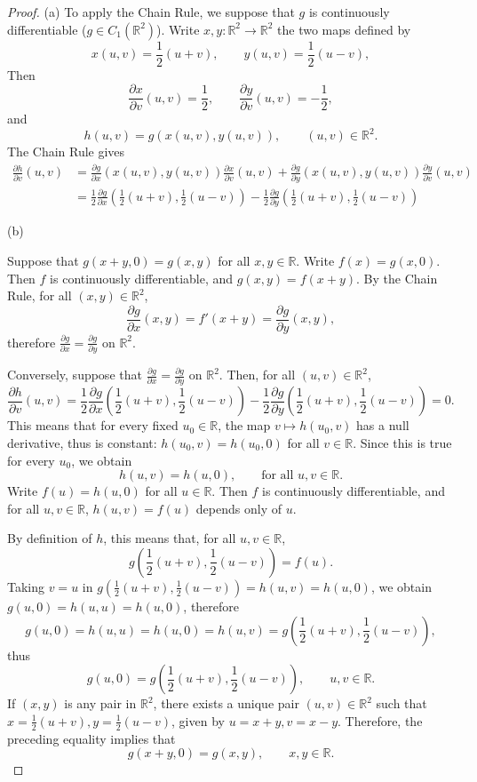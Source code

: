\documentclass[11pt,a4paper]{article}
\newcommand{\R}{\mathbb{R}}
\begin{document}
\begin{proof} 
\item[(a)] To apply the Chain Rule, we suppose that $g$ is continuously differentiable ($g \in C_1(\R^2)$). Write $x,y : \R^2 \to \R^2$ the two maps defined by
$$x(u,v) = \frac{1}{2}(u+v),\qquad y(u,v) = \frac{1}{2}(u-v),$$
Then 
$$\frac{\partial x}{\partial v}(u,v) = \frac{1}{2},\qquad \frac{\partial y}{\partial v}(u,v) = -\frac{1}{2},$$
and
$$h(u,v) = g(x(u,v),y(u,v)),\qquad (u,v)\in \R^2.$$
The Chain Rule gives
\begin{align*}
\frac{\partial h}{\partial v}(u,v)&=\frac{\partial g}{\partial x}\left(x(u,v),y(u,v)\right)\frac{\partial x}{\partial v}(u,v)+\frac{\partial g}{\partial y}\left(x(u,v),y(u,v)\right)\frac{\partial y}{\partial v}(u,v)\\
&=\frac{1}{2}\frac{\partial g}{\partial x}\left(\frac{1}{2}(u+v), \frac{1}{2}(u-v)\right)-\frac{1}{2}\frac{\partial g}{\partial y}\left(\frac{1}{2}(u+v), \frac{1}{2}(u-v)\right)
\end{align*}

\item[(b)] 

Suppose that $g(x+y,0) = g(x,y)$ for all $x,y \in \R$. Write $f(x) = g(x,0)$. Then $f$ is continuously differentiable, and $g(x,y) = f(x+y)$. By the Chain Rule, for all $(x,y) \in \R^2$,
$$
\frac{\partial g}{\partial x}(x,y) = f'(x+y) = \frac{\partial g}{\partial y}(x,y),
$$
therefore $\frac{\partial g}{\partial x} = \frac{\partial g}{\partial y}$ on $\R^2$.

\qquad

Conversely, suppose that $\frac{\partial g}{\partial x} = \frac{\partial g}{\partial y}$ on $\R^2$. Then, for all $(u,v) \in \R^2$,
$$\frac{\partial h}{\partial v}(u,v) = \frac{1}{2}\frac{\partial g}{\partial x}\left(\frac{1}{2}(u+v), \frac{1}{2}(u-v)\right)-\frac{1}{2}\frac{\partial g}{\partial y}\left(\frac{1}{2}(u+v), \frac{1}{2}(u-v) \right)= 0.$$
This means that for every fixed $u_0 \in \R$, the map $v \mapsto h(u_0,v)$ has a null derivative, thus is constant: $h(u_0,v) = h(u_0,0)$ for all $v \in \R$. Since this is true for every $u_0$, we obtain 
$$h(u,v) = h(u,0),\qquad \text{for all } u,v \in \R.$$
Write $f(u) = h(u,0)$ for all $u\in \R$. Then $f$ is continuously differentiable, and for all $u,v \in \R$, $h(u,v) = f(u)$ depends only of $u$.

By definition of $h$, this means that, for all $u,v \in \R$,
$$g\left(\frac{1}{2}(u+v), \frac{1}{2}(u-v)\right) = f(u).$$
Taking $v = u$ in $g\left(\frac{1}{2}(u+v), \frac{1}{2}(u-v)\right) = h(u,v) = h(u,0)$, we obtain $g(u,0) = h(u,u) = h(u,0)$, therefore
$$g(u,0) = h(u,u) = h(u,0) = h(u,v) = g\left(\frac{1}{2}(u+v), \frac{1}{2}(u-v)\right),$$
thus
$$g(u,0) = g\left(\frac{1}{2}(u+v), \frac{1}{2}(u-v)\right),\qquad u,v \in \R.$$
If $(x,y)$ is any pair in $\R^2$, there exists a unique pair $(u,v) \in \R^2$ such that $x = \frac{1}{2}(u+v), y = \frac{1}{2}(u-v)$, given by $u = x + y, v = x-y$. Therefore, the preceding equality implies that 
$$g(x+y,0) = g(x,y) ,\qquad x,y \in \R.$$ 


\end{proof}
\end{document}

